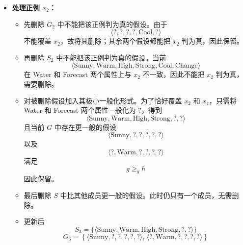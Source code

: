 \documentclass[../main.tex]{subfiles}
\begin{document}
\begin{enumerate}
{\begin{itemize}
    \item \textbf{处理正例 $x_2$：}
    \begin{itemize}
        \item 先删除 $G_2$ 中不能把该正例判为真的假设。由于
        \[
            \langle ?, ?, ?, ?, \text{Cool}, ? \rangle
        \]
        不能覆盖 $x_2$，故将其删除；其余两个假设都能把 $x_2$ 判为真，因此保留。
        \item 再删除 $S_2$ 中不能把该正例判为真的假设。当前
        \[
            \langle \text{Sunny}, \text{Warm}, \text{High}, \text{Strong}, \text{Cool}, \text{Change} \rangle
        \]
        在 Water 和 Forecast 两个属性上与 $x_2$ 不一致，因此不能把 $x_2$ 判为真，需要删除。
        \item 对被删除假设加入其极小一般化形式。为了恰好覆盖 $x_2$ 和 $x_4$，只需将 Water 和 Forecast 两个属性一般化为 $?$，得到
        \[
            \langle \text{Sunny}, \text{Warm}, \text{High}, \text{Strong}, ?, ? \rangle
        \]
        且当前 $G$ 中存在更一般的假设
        \[
            \langle \text{Sunny}, ?, ?, ?, ?, ? \rangle
        \]
        以及
        \[
            \langle ?, \text{Warm}, ?, ?, ?, ? \rangle
        \]
        满足
        \[
            g \geq_g h
        \]
        因此保留。
        \item 最后删除 $S$ 中比其他成员更一般的假设。此时仍只有一个成员，无需删除。
        \item 更新后
        \[
            S_3=\{\langle \text{Sunny}, \text{Warm}, \text{High}, \text{Strong}, ?, ? \rangle\}
        \]
        \[
            G_3=
            \left\{
            \langle \text{Sunny}, ?, ?, ?, ?, ? \rangle,\,
            \langle ?, \text{Warm}, ?, ?, ?, ? \rangle
            \right\}
        \]
    \end{itemize}


\end{itemize}}
\end{enumerate}
\end{document}
